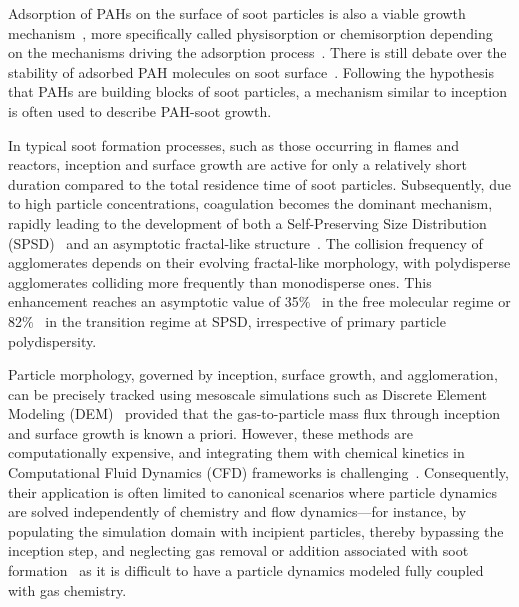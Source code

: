 
Adsorption of PAHs on the surface of soot particles is also a viable growth mechanism~\citep{frenklach1991detailed}, more specifically called physisorption or chemisorption depending on the mechanisms driving the adsorption process~\citep{michelsen2020review}. There is still debate over the stability of adsorbed PAH molecules on soot surface~\citep{obolensky2007interplay}. Following the hypothesis that PAHs are building blocks of soot particles, a mechanism similar to inception is often used to describe  PAH-soot growth.


In typical soot formation processes, such as those occurring in flames and reactors, inception and surface growth are active for only a relatively short duration compared to the total residence time of soot particles. Subsequently, due to high particle concentrations, coagulation becomes the dominant mechanism, rapidly leading to the development of both a Self-Preserving Size Distribution (SPSD)~\citep{lai1972self} and an asymptotic fractal-like structure~\citep{mountain1986simulation, Goudeli2016}.
The collision frequency of agglomerates depends on their evolving fractal-like morphology, with polydisperse agglomerates colliding more frequently than monodisperse ones. This enhancement reaches an asymptotic value of 35$\%$~\citep{Goudeli2016} in the free molecular regime or 82$\%$~\citep{kelesidis2021self} in the transition regime at SPSD, irrespective of primary particle polydispersity.

Particle morphology, governed by inception, surface growth, and agglomeration, can be precisely tracked using mesoscale simulations such as Discrete Element Modeling (DEM)~\citep{Kelesidis2017Flame} provided that the gas-to-particle mass flux through inception and surface growth is known a priori. However, these methods are computationally expensive, and integrating them with chemical kinetics in Computational Fluid Dynamics (CFD) frameworks is challenging~\citep{kelesidis2021perspective}. Consequently, their application is often limited to canonical scenarios where particle dynamics are solved independently of chemistry and flow dynamics—for instance, by populating the simulation domain with incipient particles, thereby bypassing the inception step, and neglecting gas removal or addition associated with soot formation~\citep{Kelesidis2017} as it is difficult to have a particle dynamics modeled fully coupled with gas chemistry. 

